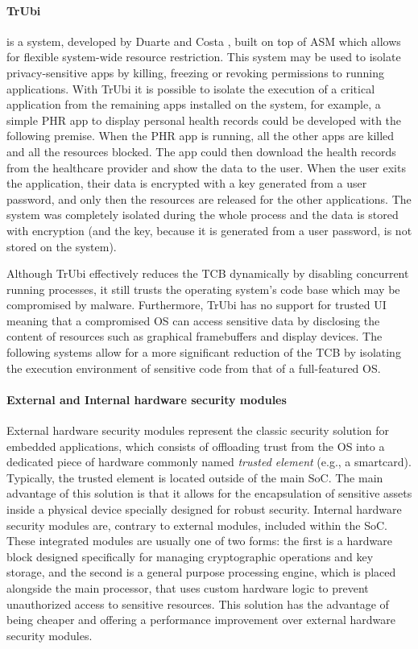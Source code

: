 \paragraph{\textbf{TrUbi}} is a system, developed by Duarte \cite{nunoduarte} and Costa \cite{miguelcosta}, built on top of ASM \cite{heuser2014asm} which allows for flexible system-wide resource restriction. This system may be used to isolate privacy-sensitive apps by killing, freezing or revoking permissions to running applications. With TrUbi it is possible to isolate the execution of a critical application from the remaining apps installed on the system, for example, a simple \ac{PHR} app to display personal health records could be developed with the following premise. When the \ac{PHR} app is running, all the other apps are killed and all the resources blocked. The app could then download the health records from the healthcare provider and show the data to the user. When the user exits the application, their data is encrypted with a key generated from a user password, and only then the resources are released for the other applications. The system was completely isolated during the whole process and the data is stored with encryption (and the key, because it is generated from a user password, is not stored on the system).

Although TrUbi effectively reduces the TCB dynamically by disabling concurrent running processes, it still trusts the operating system's code base which may be compromised by malware. Furthermore, TrUbi has no support for trusted UI meaning that a compromised OS can access sensitive data by disclosing the content of resources such as graphical framebuffers and display devices. The following systems allow for a more significant reduction of the TCB by isolating the execution environment of sensitive code from that of a full-featured OS.

\paragraph{\textbf{External and Internal hardware security modules}} External hardware security modules represent the classic security solution for embedded applications, which consists of offloading trust from the OS into a dedicated piece of hardware commonly named \emph{trusted element} (e.g., a smartcard). Typically, the trusted element is located outside of the main \ac{SoC}. The main advantage of this solution is that it allows for the encapsulation of sensitive assets inside a physical device specially designed for robust security. Internal hardware security modules are, contrary to external modules, included within the \ac{SoC}. These integrated modules are usually one of two forms: the first is a hardware block designed specifically for managing cryptographic operations and key storage, and the second is a general purpose processing engine, which is placed alongside the main processor, that uses custom hardware logic to prevent unauthorized access to sensitive resources. This solution has the advantage of being cheaper and offering a performance improvement over external hardware security modules.

